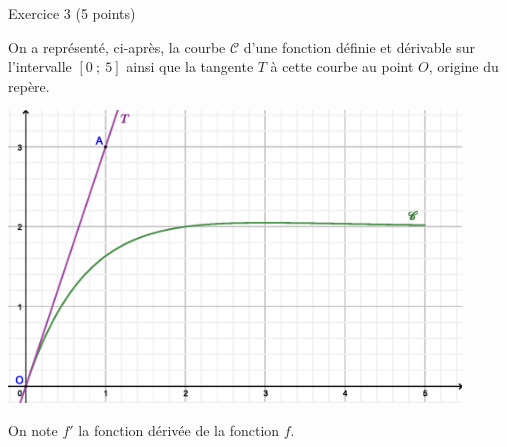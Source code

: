 
%
\begin{h2}Exercice 3 (5 points)\end{h2}
\par
On a représenté, ci-après, la courbe $\mathscr{C}$ d'une fonction définie et dérivable sur l'intervalle $[0~;~5]$ ainsi que la tangente $T$ à cette courbe au point $O$, origine du repère.
\par

\begin{center}
\end{center}
\begin{center}
     \begin{extern}%
          \includegraphics[width=0.9\textwidth]{images/BBESL-s3-3-1}%
     \end{extern}
\end{center}
\par
On note $f'$ la fonction dérivée de la fonction $f$.
\par
%
%
\par
